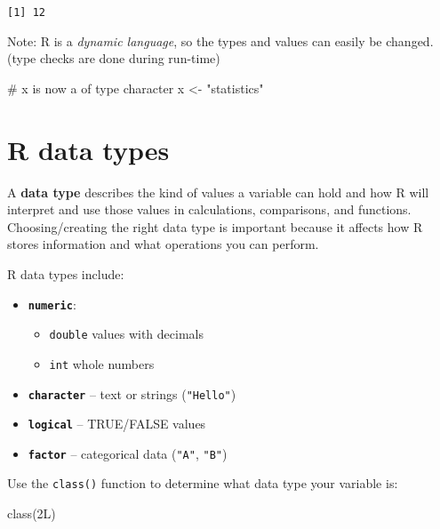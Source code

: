 \documentclass[
  letterpaper,
  DIV=11,
  numbers=noendperiod]{scrreprt}
\newenvironment{Shaded}{\begin{snugshade}}{\end{snugshade}}
\newcommand{\CommentTok}[1]{\textcolor[rgb]{0.37,0.37,0.37}{#1}}
\newcommand{\DecValTok}[1]{\textcolor[rgb]{0.68,0.00,0.00}{#1}}
\newcommand{\FunctionTok}[1]{\textcolor[rgb]{0.28,0.35,0.67}{#1}}
\newcommand{\NormalTok}[1]{\textcolor[rgb]{0.00,0.23,0.31}{#1}}
\newcommand{\OtherTok}[1]{\textcolor[rgb]{0.00,0.23,0.31}{#1}}
\newcommand{\StringTok}[1]{\textcolor[rgb]{0.13,0.47,0.30}{#1}}
\begin{document}
\begin{verbatim}
[1] 12
\end{verbatim}

Note: R is a \emph{dynamic language}, so the types and values can easily
be changed. (type checks are done during run-time)

\begin{Shaded}
\begin{Highlighting}[]
\CommentTok{\# x is now a of type character}
\NormalTok{x }\OtherTok{\textless{}{-}} \StringTok{"statistics"}
\end{Highlighting}
\end{Shaded}

\section*{R data types}\label{r-data-types}


A \textbf{data type} describes the kind of values a variable can hold
and how R will interpret and use those values in calculations,
comparisons, and functions. Choosing/creating the right data type is
important because it affects how R stores information and what
operations you can perform.

R data types include:

\begin{itemize}
\item
  \textbf{\texttt{numeric}}:

  \begin{itemize}
  \item
    \texttt{double} values with decimals
  \item
    \texttt{int} whole numbers
  \end{itemize}
\item
  \textbf{\texttt{character}} -- text or strings (\texttt{"Hello"})
\item
  \textbf{\texttt{logical}} -- TRUE/FALSE values
\item
  \textbf{\texttt{factor}} -- categorical data (\texttt{"A"},
  \texttt{"B"})
\end{itemize}

Use the \texttt{class()} function to determine what data type your
variable is:

\begin{Shaded}
\begin{Highlighting}[]
\FunctionTok{class}\NormalTok{(}\DecValTok{2}\NormalTok{L)}
\end{Highlighting}
\end{Shaded}
\end{document}
